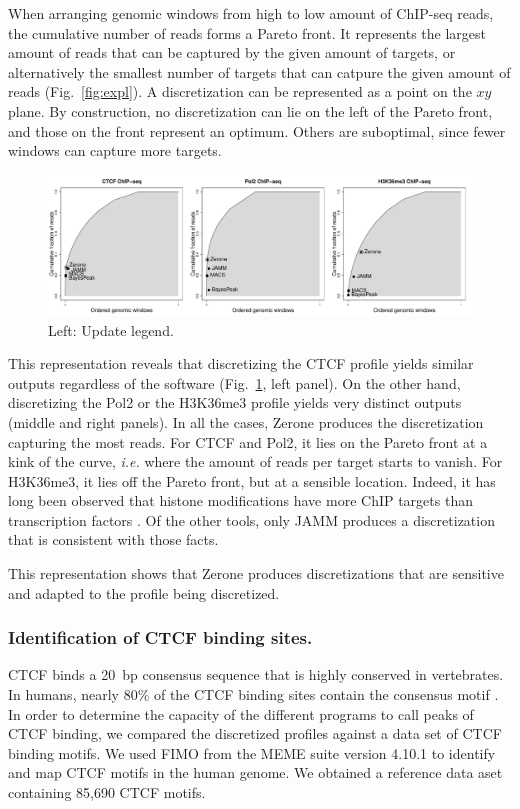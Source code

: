 \documentclass{bioinfo}
\begin{document}
When arranging genomic windows from high to low amount of ChIP-seq
reads, the cumulative number of reads forms a Pareto front.
It represents the largest amount of reads that can be captured by the
given amount of targets, or alternatively the smallest number of
targets that can catpure the given amount of reads
(Fig.~\ref{fig:expl}). A discretization can be represented as a point
on the $xy$ plane.  By construction, no discretization can lie on the
left of the Pareto front, and those on the front represent an
optimum. Others are suboptimal, since fewer windows can capture more
targets.

\begin{figure}
\centerline{\includegraphics[scale=0.4]{pareto_front.pdf}}
\caption{Left: Update legend.}
\label{fig:pareto}
\end{figure}

This representation reveals that discretizing the CTCF profile yields
similar outputs regardless of the software (Fig.~\ref{fig:pareto},
left panel). On the other hand, discretizing the Pol2 or the H3K36me3
profile yields very distinct outputs (middle and right panels). In
all the cases, Zerone produces the discretization capturing the most reads.
For CTCF and Pol2, it lies on the Pareto front at a kink of the curve,
\textit{i.e.} where the amount of reads per target starts to vanish. For
H3K36me3, it lies off the Pareto front, but at a sensible location.
Indeed, it has long been observed that histone modifications have more
ChIP targets than transcription factors \citep{XXX}. Of the other tools,
only JAMM produces a discretization that is consistent with those
facts.

This representation shows that Zerone produces discretizations that
are sensitive and adapted to the profile being discretized.


\subsubsection{Identification of CTCF binding sites.}
CTCF binds a 20~bp consensus sequence that is highly conserved in
vertebrates. In humans, nearly 80\% of the CTCF binding
sites contain the consensus motif \citep{pmid17382889}. In order to
determine the capacity of the different programs to call peaks of CTCF
binding, we compared the discretized profiles against a data set of CTCF
binding motifs. We used FIMO \citep{pmid21330290} from the MEME suite
version 4.10.1 \citep{pmid19458158} to identify and map CTCF motifs in
the human genome. We obtained a reference data aset containing 85,690
CTCF motifs.
\end{document}
